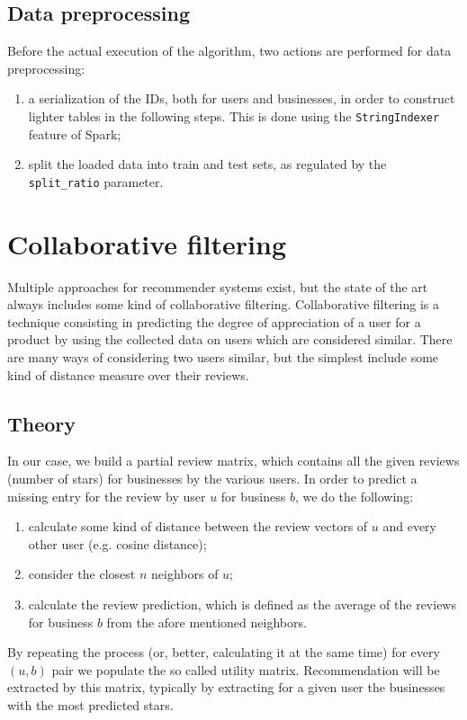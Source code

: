 \documentclass[11pt,a4paper]{article}
\newcommand{\code}{\texttt}
\begin{document}
\begin{multicols}{2}
\subsection{Data preprocessing}
Before the actual execution of the algorithm, two actions are performed for data preprocessing:
\begin{enumerate}
	\item a serialization of the IDs, both for users and businesses, in order to construct lighter tables in the following steps. This is done using the \code{StringIndexer} feature of Spark;
	\item split the loaded data into train and test sets, as regulated by the \code{split\_ratio} parameter.
\end{enumerate}



\label{collabfiltering}
\section{Collaborative filtering}
Multiple approaches for recommender systems exist, but the state of the art always includes some kind of collaborative filtering.
Collaborative filtering is a technique consisting in predicting the degree of appreciation of a user for a product by using the collected data on users which are considered similar.
There are many ways of considering two users similar, but the simplest include some kind of distance measure over their reviews.


\subsection{Theory}
In our case, we build a partial review matrix, which contains all the given reviews (number of stars) for businesses by the various users.
In order to predict a missing entry for the review by user $u$ for business $b$, we do the following:
\begin{enumerate}
	\item calculate some kind of distance between the review vectors of $u$ and every other user (e.g. cosine distance);
	\item consider the closest $n$ neighbors of $u$;
	\item calculate the review prediction, which is defined as the average of the reviews for business $b$ from the afore mentioned neighbors.
\end{enumerate}
By repeating the process (or, better, calculating it at the same time) for every $(u,b)$ pair we populate the so called utility matrix.
Recommendation will be extracted by this matrix, typically by extracting for a given user the businesses with the most predicted stars.



\end{multicols}
\end{document}
